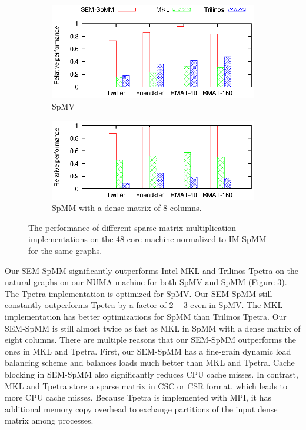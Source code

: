\begin{figure}
	\footnotesize
	\centering
	\begin{subfigure}[b]{0.5\textwidth}
		\centering
		\includegraphics[scale=1]{SpMM_figs/SpMV-awesomer.eps}
		\vspace{-5pt}
		\caption{SpMV}
		\label{perf:spmv}
	\end{subfigure}
	\begin{subfigure}[b]{0.5\textwidth}
		\centering
		\includegraphics[scale=1]{SpMM_figs/SpMM-awesomer.eps}
		\vspace{-5pt}
		\caption{SpMM with a dense matrix of 8 columns.}
		\label{perf:spmm8}
	\end{subfigure}
	\vspace{3pt}
	\caption{The performance of different sparse matrix multiplication
		implementations on the 48-core machine normalized to IM-SpMM for
	the same graphs.}
	\label{perf:spmm}
\end{figure}

Our SEM-SpMM significantly outperforms Intel MKL and Trilinos Tpetra on the natural
graphs on our NUMA machine for both SpMV and SpMM (Figure \ref{perf:spmm}).
The Tpetra implementation is optimized for SpMV. Our SEM-SpMM still constantly
outperforms Tpetra by a factor of $2-3$ even in SpMV. The MKL implementation has
better optimizations for SpMM than Trilinos Tpetra. Our SEM-SpMM is still almost
twice as fast as MKL in SpMM with a dense matrix of eight columns. There are
multiple reasons that our SEM-SpMM outperforms the ones in MKL and Tpetra.
First, our SEM-SpMM has a fine-grain dynamic load balancing scheme and
balances loads much better than MKL and Tpetra. Cache blocking in SEM-SpMM
also significantly reduces CPU cache misses. In contrast, MKL and Tpetra store
a sparse matrix in CSC or CSR format,
which leads to more CPU cache misses. Because Tpetra
is implemented with MPI, it has additional memory copy overhead to exchange
partitions of the input dense matrix among processes.

